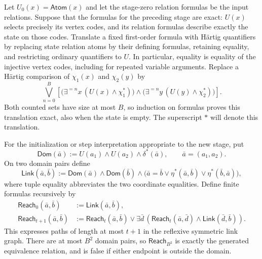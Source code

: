 Let $U_0(x)=\mathsf{Atom}(x)$ and let the stage-zero relation formulas be
the input relations. Suppose that the formulas for the preceding stage
are exact: $U(x)$ selects precisely its vertex codes, and its relation
formulas describe exactly the state on those codes. Translate a fixed
first-order formula with H\"artig quantifiers by replacing state relation
atoms by their defining formulas, retaining equality, and restricting
ordinary quantifiers to $U$. In particular, equality is equality of the
injective vertex codes, including for repeated variable arguments.
Replace a H\"artig comparison of $\chi_1(x)$ and $\chi_2(y)$ by
\begin{equation}\label{eq:hartig-translation}
 \bigvee_{n=0}^{B}
 \left[
  \bigl(\exists^{=n}x\,(U(x)\wedge\chi_1^*)\bigr)
  \wedge
  \bigl(\exists^{=n}y\,(U(y)\wedge\chi_2^*)\bigr)
 \right].
\end{equation}
Both counted sets have size at most $B$, so induction on formulas proves
this translation exact, also when the state is empty. The superscript
$*$ will denote this translation.

For the initialization or step interpretation appropriate to the new
stage, put
\[
 \mathsf{Dom}(\bar a):=U(a_1)\wedge U(a_2)\wedge\delta^*(\bar a),
 \qquad \bar a=(a_1,a_2).
\]
On two domain pairs define
\[
 \mathsf{Link}(\bar a,\bar b):=
 \mathsf{Dom}(\bar a)\wedge\mathsf{Dom}(\bar b)\wedge
 \bigl(\bar a=\bar b\vee\eta^*(\bar a,\bar b)
                         \vee\eta^*(\bar b,\bar a)\bigr),
\]
where tuple equality abbreviates the two coordinate equalities. Define
finite formulas recursively by
\[
 \begin{split}
 \mathsf{Reach}_0(\bar a,\bar b)&:=\mathsf{Link}(\bar a,\bar b),\\
 \mathsf{Reach}_{t+1}(\bar a,\bar b)&:=
 \mathsf{Reach}_t(\bar a,\bar b)\vee
 \exists\bar d\,
  (\mathsf{Reach}_t(\bar a,\bar d)\wedge
                         \mathsf{Link}(\bar d,\bar b)).
 \end{split}
\]
This expresses paths of length at most $t+1$ in the reflexive symmetric
link graph. There are at most $B^2$ domain pairs, so
$\mathsf{Reach}_{B^2}$ is exactly the generated equivalence relation,
and is false if either endpoint is outside the domain.

